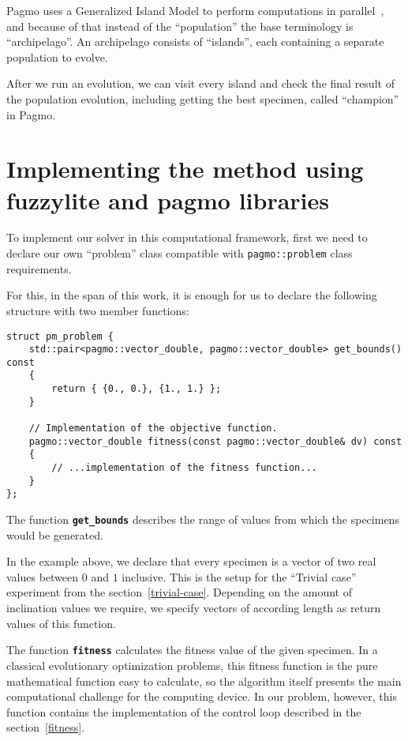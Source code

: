 \documentclass[12pt, a4paper]{report}
\begin{document}
	Pagmo uses a Generalized Island Model to perform computations in parallel~\cite{Izzo2012}, and because of that instead of the ``population'' the base terminology is ``archipelago''.
	An archipelago consists of ``islands'', each containing a separate population to evolve.
	
	After we run an evolution, we can visit every island and check the final result of the population evolution, including getting the best specimen, called ``champion'' in Pagmo.
	
	\section{Implementing the method using fuzzylite and pagmo libraries}\label{section::implementation}
	
	To implement our solver in this computational framework, first we need to declare our own ``problem'' class compatible with \texttt{pagmo::problem} class requirements.
	
	For this, in the span of this work, it is enough for us to declare the following structure with two member functions:
	
	\begin{lstlisting}[language={[11]c++}]
struct pm_problem {
	std::pair<pagmo::vector_double, pagmo::vector_double> get_bounds() const
	{
		return { {0., 0.}, {1., 1.} };
	}
	
	// Implementation of the objective function.
	pagmo::vector_double fitness(const pagmo::vector_double& dv) const
	{
		// ...implementation of the fitness function...
	}
};
	\end{lstlisting}
	
	The function \textbf{\texttt{get\_bounds}} describes the range of values from which the specimens would be generated.
	
	In the example above, we declare that every specimen is a vector of two real values between $0$ and $1$ inclusive.
	This is the setup for the ``Trivial case'' experiment from the section~\ref{trivial-case}.
	Depending on the amount of inclination values we require, we specify vectors of according length as return values of this function.
	
	The function \textbf{\texttt{fitness}} calculates the fitness value of the given specimen.
	In a classical evolutionary optimization problems, this fitness function is the pure mathematical function easy to calculate, so the algorithm itself presents the main computational challenge for the computing device.
	In our problem, however, this function contains the implementation of the control loop described in the section~\ref{fitness}.
	
\end{document}
